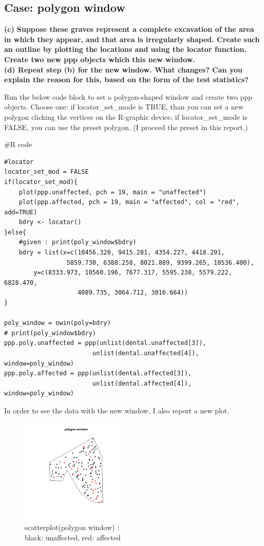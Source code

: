 \documentclass{article}
\newenvironment{Rcode}%
{%
    \begin{mdframed}
    \#R code
    \begin{small}
}
{%
    \end{small}
    \end{mdframed}
}
\begin{document}
\subsection{Case: polygon window}
\textbf{
    (c) Suppose these graves represent a complete excavation of the area in which they appear,
    and that area is irregularly shaped. Create such an outline by plotting the locations and using the locator function.
    Create two new ppp objects which this new window. \\
    (d) Repeat step (b) for the new window. What changes?
    Can you explain the reason for this, based on the form of the test statistics?
}

Run the below code block to set a polygon-shaped window and create two ppp objects.
Choose one: 
if locator\_set\_mode is TRUE, than you can set a new polygon clicking the vertices on the R-graphic device,
if locator\_set\_mode is FALSE, you can use the preset polygon.
(I proceed the preset in this report.)

\begin{Rcode}
    \begin{verbatim}
#locator
locator_set_mod = FALSE
if(locator_set_mod){
    plot(ppp.unaffected, pch = 19, main = "unaffected")
    plot(ppp.affected, pch = 19, main = "affected", col = "red", add=TRUE)
    bdry <- locator()
}else{
    #given : print(poly_window$bdry)
    bdry = list(x=c(10456.320, 9415.281, 4354.227, 4418.291,
                 5859.730, 6388.258, 8021.889, 9399.265, 10536.400),
        y=c(8333.973, 10560.196, 7677.317, 5595.238, 5579.222, 6828.470, 
                    4089.735, 3064.712, 3016.664))
}

poly_window = owin(poly=bdry)
# print(poly_window$bdry)
ppp.poly.unaffected = ppp(unlist(dental.unaffected[3]), 
                        unlist(dental.unaffected[4]), window=poly_window)
ppp.poly.affected = ppp(unlist(dental.affected[3]), 
                        unlist(dental.affected[4]), window=poly_window)
    \end{verbatim}
\end{Rcode}


In order to see the data with the new window, I also report a new plot.


\begin{figure}[!h]
    \centering
    \includegraphics[width=5cm]{prob1_poly_window_scatterplot.png}
    \caption{scatterplot(polygon window) : \\black: unaffected, red: affected}
\end{figure}
\end{document}
